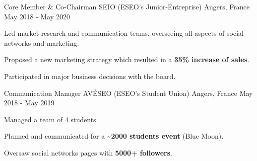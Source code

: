 

\begin{cventries}

  \cventry
    {Core Member \& Co-Chairman} %
    {SEIO (ESEO's Junior-Entreprise)} %
    {Angers, France} %
    {May 2018 - May 2020} %
    {
      \begin{cvitems} %
        \item {Led market research and communication teams, overseeing all aspects of social networks and marketing.}
        \item {Proposed a new marketing strategy which resulted in a \textbf{35\% increase of sales}.}
        \item {Participated in major business decisions with the board.}
      \end{cvitems}
    }

  \cventry
    {Communication Manager} %
    {AVÉSEO (ESEO's Student Union)} %
    {Angers, France} %
    {May 2018 - May 2019} %
    {
      \begin{cvitems} %
        \item {Managed a team of 4 students.}
        \item {Planned and communicated for a \textbf{\textasciitilde2000 students event} (Blue Moon).}
        \item {Oversaw social networks pages with \textbf{5000+ followers}.}
      \end{cvitems}
    }

\end{cventries}
